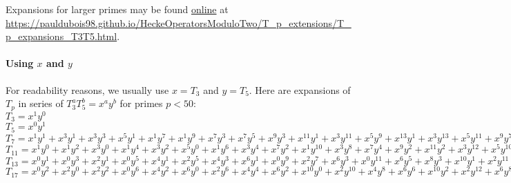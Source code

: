 Expansions for larger primes may be found \href{https://pauldubois98.github.io/HeckeOperatorsModuloTwo/T_p_extensions/T_p_expansions_T3T5.html}{online} at \url{https://pauldubois98.github.io/HeckeOperatorsModuloTwo/T_p_extensions/T_p_expansions_T3T5.html}.

\paragraph{Using $x$ and $y$}
For readability reasons, we usually use $x = T_3$ and $y = T_5$.
Here are expansions of $T_p$ in series of $T_3^aT_5^b = x^ay^b$ for primes $p<50$:\\
$T_{3} = x^{1}y^{0} $\\
$T_{5} = x^{0}y^{1} $\\
$T_{7} = x^{1}y^{1} + x^{3}y^{1} + x^{3}y^{3} + x^{5}y^{1} + x^{1}y^{7} + x^{1}y^{9} + x^{7}y^{3} + x^{7}y^{5} + x^{9}y^{3} + x^{11}y^{1} + x^{3}y^{11} + x^{5}y^{9} + x^{13}y^{1} + x^{3}y^{13} + x^{5}y^{11} + x^{9}y^{7} + x^{11}y^{5} + x^{13}y^{3} + x^{3}y^{15} + x^{7}y^{11} + x^{9}y^{9} + x^{13}y^{5} + x^{15}y^{3} + \dots $\\
$T_{11} = x^{1}y^{0} + x^{1}y^{2} + x^{3}y^{0} + x^{1}y^{4} + x^{3}y^{2} + x^{5}y^{0} + x^{1}y^{6} + x^{3}y^{4} + x^{7}y^{2} + x^{1}y^{10} + x^{3}y^{8} + x^{7}y^{4} + x^{9}y^{2} + x^{11}y^{2} + x^{3}y^{12} + x^{5}y^{10} + x^{7}y^{8} + x^{11}y^{4} + x^{13}y^{2} + x^{9}y^{8} + x^{17}y^{0} + \dots $\\ 
$T_{13} = x^{0}y^{1} + x^{0}y^{3} + x^{2}y^{1} + x^{0}y^{5} + x^{4}y^{1} + x^{2}y^{5} + x^{4}y^{3} + x^{6}y^{1} + x^{0}y^{9} + x^{2}y^{7} + x^{6}y^{3} + x^{0}y^{11} + x^{6}y^{5} + x^{8}y^{3} + x^{10}y^{1} + x^{2}y^{11} + x^{4}y^{9} + x^{6}y^{7} + x^{10}y^{3} + x^{2}y^{13} + x^{4}y^{11} + x^{14}y^{1} + x^{2}y^{15} + x^{4}y^{13} + x^{6}y^{11} + x^{12}y^{5} + x^{16}y^{1} + \dots $\\
$T_{17} = x^{0}y^{2} + x^{2}y^{0} + x^{2}y^{2} + x^{0}y^{6} + x^{4}y^{2} + x^{6}y^{0} + x^{2}y^{6} + x^{4}y^{4} + x^{6}y^{2} + x^{10}y^{0} + x^{2}y^{10} + x^{4}y^{8} + x^{6}y^{6} + x^{10}y^{2} + x^{2}y^{12} + x^{6}y^{8} + x^{10}y^{4} + x^{2}y^{14} + x^{6}y^{10} + x^{8}y^{8} + x^{12}y^{4} + x^{14}y^{2} + x^{4}y^{14} + x^{8}y^{10} + x^{10}y^{8} + x^{12}y^{6} + x^{16}y^{2} + x^{18}y^{0} + \dots $\\
